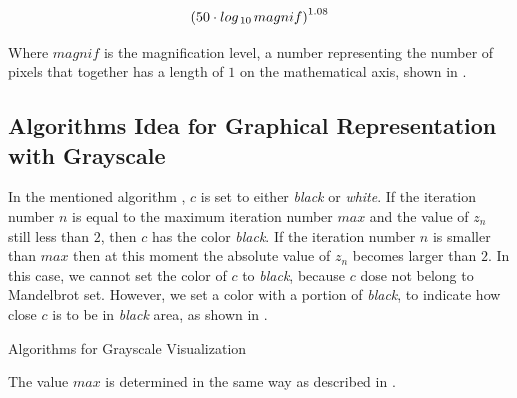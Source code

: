 \begin{equation}
    \label{eq:max}
    {(50 \cdot log_{\thinspace 10 \thinspace}{magnif})}^{1.08}
\end{equation}

Where $magnif$ is the magnification level, a number representing the number of pixels that together has a length of $1$ on the mathematical axis, shown in .

\subsection*{Algorithms Idea for Graphical Representation with Grayscale}

In the mentioned algorithm , $c$ is set to either \emph{black} or \emph{white}. If the iteration number $n$ is equal to the maximum iteration number $max$ and the value of $z_n$ still less than $2$, then $c$ has the color \emph{black}. If the iteration number $n$ is smaller than $max$ then at this moment the absolute value of $z_n$ becomes larger than $2$. In this case, we cannot set the color of $c$ to \emph{black}, because $c$ dose not belong to Mandelbrot set. However, we set a color with a portion of \emph{black}, to indicate how close $c$ is to be in \emph{black} area, as shown in .

\begin{algorithm}[H]
    \caption{Algorithms for Grayscale Visualization}
    \label{alg:grayscale}
\end{algorithm}

The value $max$ is determined in the same way as described in .